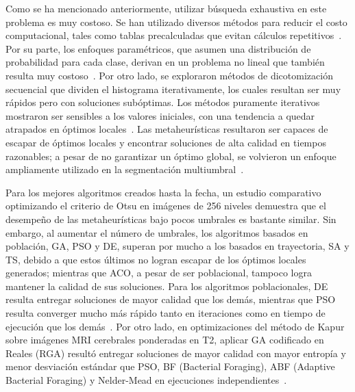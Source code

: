 \documentclass[letter, 10pt]{article}
\begin{document}
Como se ha mencionado anteriormente, utilizar b\'usqueda exhaustiva en este problema es muy costoso. Se han utilizado diversos m\'etodos para reducir el costo computacional,
tales como tablas precalculadas que evitan c\'alculos repetitivos~\cite{Hammouche2010Comparative, Manikandan2014Multilevel}.
Por su parte, los enfoques param\'etricos, que asumen una distribuci\'on de probabilidad para cada clase, derivan en un problema no lineal que tambi\'en resulta muy costoso~\cite{Hammouche2010Comparative}.
Por otro lado, se exploraron m\'etodos de dicotomizaci\'on secuencial que dividen el histograma iterativamente, los cuales resultan ser muy r\'apidos pero con soluciones sub\'optimas.
Los m\'etodos puramente iterativos mostraron ser sensibles a los valores iniciales, con una tendencia a quedar atrapados en \'optimos locales~\cite{Hammouche2010Comparative}.
Las metaheur\'isticas resultaron ser capaces de escapar de \'optimos locales y encontrar soluciones de alta calidad en tiempos razonables; a pesar de no garantizar un \'optimo global,
se volvieron un enfoque ampliamente utilizado en la segmentaci\'on multiumbral~\cite{Hammouche2010Comparative, Lameesa2024Role}.

Para los mejores algoritmos creados hasta la fecha, un estudio comparativo optimizando el criterio de Otsu en im\'agenes de 256 niveles demuestra que
el desempe\~no de las metaheur\'isticas bajo pocos umbrales es bastante similar. Sin embargo, al aumentar el n\'umero de umbrales,
los algoritmos basados en poblaci\'on, GA, PSO y DE, superan por mucho a los basados en trayectoria, SA y TS,
debido a que estos \'ultimos no logran escapar de los \'optimos locales generados; mientras que ACO, a pesar de ser poblacional, tampoco logra mantener la calidad de sus soluciones.
Para los algoritmos poblacionales, DE resulta entregar soluciones de mayor calidad que los dem\'as,
mientras que PSO resulta converger mucho m\'as r\'apido tanto en iteraciones como en tiempo de ejecuci\'on que los dem\'as~\cite{Hammouche2010Comparative}.
Por otro lado, en optimizaciones del m\'etodo de Kapur sobre im\'agenes MRI cerebrales ponderadas en T2, aplicar GA codificado en Reales (RGA) result\'o entregar soluciones de mayor calidad con mayor entrop\'ia y menor desviaci\'on est\'andar que PSO, BF (Bacterial Foraging), ABF (Adaptive Bacterial Foraging) y Nelder-Mead en ejecuciones independientes~\cite{Manikandan2014Multilevel}.
\end{document}
